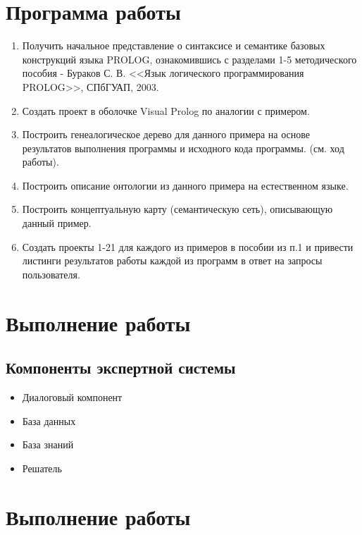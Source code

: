 





\tableofcontents
\newpage

\section{Программа работы}

\begin{enumerate}
	\item Получить начальное представление о синтаксисе и семантике базовых конструкций языка PROLOG, ознакомившись с разделами 1-5 методического пособия - Бураков С. В. <<Язык логического программирования PROLOG>>, СПбГУАП, 2003.
	\item Создать проект в оболочке Visual Prolog по аналогии с примером.
	\item Построить генеалогическое дерево для данного примера на основе результатов выполнения программы и исходного кода программы. (см. ход работы).
	\item Построить описание онтологии из данного примера на естественном языке.
	\item Построить концептуальную карту (семантическую сеть), описывающую данный пример.
	\item Создать проекты 1-21 для каждого из примеров в пособии из п.1 и привести листинги результатов работы каждой из программ в ответ на запросы пользователя.
\end{enumerate}

\newpage

\section{Выполнение работы}

\subsection{Компоненты экспертной системы}

\begin{itemize}
	\item Диалоговый компонент
	\item База данных
	\item База знаний
	\item Решатель
\end{itemize}

\section{Выполнение работы}

